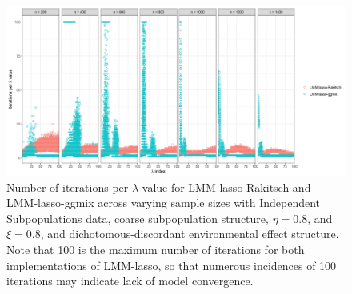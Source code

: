 \begin{figure}[H]
    \centering
    \includegraphics[width=\textwidth]{figures/figure_11.png}
    \caption{Number of iterations per $\lambda$ value for LMM-lasso-Rakitsch and LMM-lasso-ggmix across varying sample sizes with Independent Subpopulations data, coarse subpopulation structure, $\eta = 0.8$, and $\xi = 0.8$, and dichotomous-discordant environmental effect structure. Note that 100 is the maximum number of iterations for both implementations of LMM-lasso, so that numerous incidences of 100 iterations may indicate lack of model convergence.}
    \label{fig:niter}
\end{figure}
